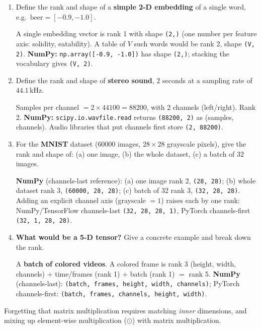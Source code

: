 \documentclass[10pt,a4paper]{article}
\newcommand{\q}[1]{\item #1}
\begin{document}
\begin{enumerate}[leftmargin=*,label=\textbf{Q\arabic*.}]
\q Define the rank and shape of a \textbf{simple 2-D embedding} of a single word, e.g.\ $\mathrm{beer}=[-0.9,-1.0]$.
\begin{answerbox}
A single embedding vector is rank 1 with shape \texttt{(2,)} (one number per feature axis: solidity, eatability). A table of $V$ such words would be rank 2, shape \texttt{(V, 2)}. \textbf{NumPy:} \texttt{np.array([-0.9, -1.0])} has shape \texttt{(2,)}; stacking the vocabulary gives \texttt{(V, 2)}.
\end{answerbox}

\q Define the rank and shape of \textbf{stereo sound}, $2$ seconds at a sampling rate of $44.1$\,kHz.
\begin{answerbox}
Samples per channel $= 2 \times 44100 = 88200$, with 2 channels (left/right). Rank 2. \textbf{NumPy:} \texttt{scipy.io.wavfile.read} returns \texttt{(88200, 2)} as (samples, channels). Audio libraries that put channels first store \texttt{(2, 88200)}.
\end{answerbox}

\q For the \textbf{MNIST} dataset ($60000$ images, $28\times28$ grayscale pixels), give the rank and shape of: (a) one image, (b) the whole dataset, (c) a batch of $32$ images.
\begin{answerbox}
\textbf{NumPy} (channels-last reference): (a) one image rank 2, \texttt{(28, 28)}; (b) whole dataset rank 3, \texttt{(60000, 28, 28)}; (c) batch of 32 rank 3, \texttt{(32, 28, 28)}. Adding an explicit channel axis (grayscale $=1$) raises each by one rank: NumPy/TensorFlow channels-last \texttt{(32, 28, 28, 1)}, PyTorch channels-first \texttt{(32, 1, 28, 28)}.
\end{answerbox}

\q \textbf{What would be a 5-D tensor?} Give a concrete example and break down the rank.
\begin{answerbox}
A \textbf{batch of colored videos}. A colored frame is rank 3 (height, width, channels) $+$ time/frames (rank 1) $+$ batch (rank 1) $=$ rank 5. \textbf{NumPy} (channels-last): \texttt{(batch, frames, height, width, channels)}; PyTorch channels-first: \texttt{(batch, frames, channels, height, width)}.
\end{answerbox}

\end{enumerate}

\begin{examtipbox}
Forgetting that matrix multiplication requires matching \emph{inner} dimensions, and mixing up element-wise multiplication ($\odot$) with matrix multiplication.
\end{examtipbox}
\end{document}
